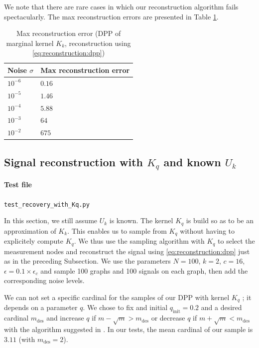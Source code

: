 \documentclass{article}
\begin{document}
We note that there are rare cases in which our reconstruction algorithm fails spectacularly. The max reconstruction errors are presented in Table \ref{tab:Kk:maxrecerror}. 


\begin{table}[ht]
  \caption{Max reconstruction error (DPP of marginal kernel $K_k$, reconstruction using \eqref{eq:reconstruction:dpp})}
  \label{tab:Kk:maxrecerror}
  \centering
  \begin{tabular}{ll}
    \toprule
    Noise $\sigma$ &  Max reconstruction error \\
    \midrule
    $10^{-6}$ & $0.16$ \\
    $10^{-5}$ & $1.46$ \\
    $10^{-4}$ & $5.88$ \\
		$10^{-3}$ & $64$ \\
		$10^{-2}$ & $675$ \\
    \bottomrule
  \end{tabular}
\end{table}




\subsection[Signal reconstruction with Kq and known Uk]{Signal reconstruction with $K_q$ and known $U_k$}


\paragraph{Test file} \verb#test_recovery_with_Kq.py#


In this section, we still assume $U_k$ is known. The kernel $K_q$ is build so as to be an approximation of $K_k$. This enables us to sample from $K_q$ without having to explicitely compute $K_q$. We thus use the sampling algorithm with $K_q$ to select the measurement nodes and reconstruct the signal using \eqref{eq:reconstruction:dpp} just as in the preceding Subsection. We use the parameters $N=100$, $k=2$, $c=16$, $\epsilon = 0.1 \times \epsilon_c$ and sample 100 graphs and 100 signals on each graph, then add the corresponding noise levels.


We can not set a specific cardinal for the samples of our DPP with kernel $K_q$ ; it depends on a parameter $q$. We chose to fix and initial $q_\text{init}=0.2$ and a desired cardinal $m_\text{des}$ and increase $q$ if $m - \sqrt{m} > m_\text{des}$ or decrease $q$ if $m + \sqrt{m} < m_\text{des}$ with the algorithm suggested in \cite{avena2013}. In our tests, the mean cardinal of our sample is $3.11$ (with $m_\text{des} = 2$). 
\end{document}
